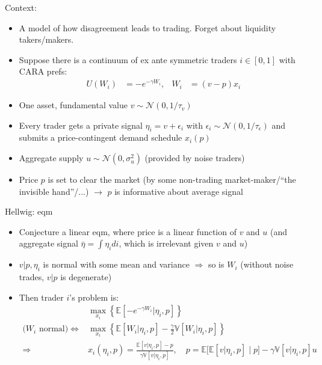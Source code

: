 \documentclass[english,10pt
,aspectratio=169
]{beamer}
\begin{document}
\begin{frame}{Context: \cite{hellwig_aggregation_1980}}
	\begin{itemize}
		\item A model of how disagreement leads to trading. Forget about liquidity takers/makers.
		\item Suppose there is a continuum of ex ante symmetric traders $i \in [0,1]$ with CARA prefs:
		\begin{align*}
			U(W_i)&=-e^{-\gamma W_i}, &
			W_i & = (v - p){x_i}
		\end{align*}
		\item One asset, fundamental value $v \sim \mathcal{N}(0,1/\tau_v)$
		\item Every trader gets a private signal $\eta_i = v + \epsilon_i$ with $\epsilon_i \sim \mathcal{N}(0,1/\tau_\epsilon)$ and submits a price-contingent demand schedule $x_i(p)$
		\item Aggregate supply $u \sim \mathcal{N}(0, \sigma^2_u)$ (provided by noise traders)
		\item Price $p$ is set to clear the market (by some non-trading market-maker/``the invisible hand''/...)
		$\to$ $p$ is informative about average signal
	\end{itemize}
\end{frame}


\begin{frame}{Hellwig: eqm}
	\begin{itemize}
		\item Conjecture a linear eqm, where price is a linear function of $v$ and $u$ (and aggregate signal $\bar{\eta} = \int \eta_i di$, which is irrelevant given $v$ and $u$)
		\item $v | p, \eta_i$ is normal with some mean and variance $\Rightarrow$ so is $W_i$
		(without noise trades, $v|p$ is degenerate)
		
		\item Then trader $i$'s problem is:
		\begin{align*}
			&\max_{x_i} \left\{ \mathbb{E} \left[ -e^{-\gamma W_i} | \eta_i, p \right] \right\} 
			\\
			\text{($W_i$ normal)} \iff 
			&\max_{x_i} \left\{\mathbb{E} \left[ W_i| \eta_i, p\right] - \frac{\gamma}{2} \mathbb{V}\left[W_i| \eta_i, p \right] \right\}
			\\
			\Rightarrow & x_i(\eta_i,p) = \frac{\mathbb{E} \left[ v | \eta_i, p\right] - p}{\gamma \mathbb{V} \left[ v| \eta_i, p\right]}, \quad p= \mathbb{E} \Big[ \mathbb{E} [v|\eta_i,p] \mid p \Big] - \gamma \mathbb{V} \left[ v| \eta_i, p\right] u
		\end{align*}
	\end{itemize}
\end{frame}
\end{document}
